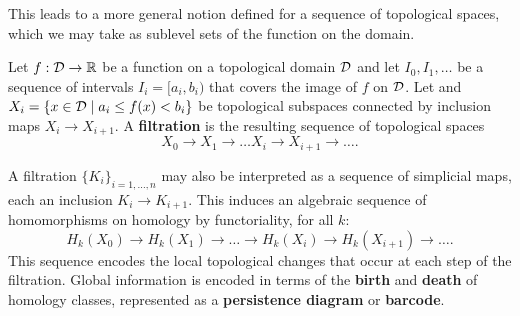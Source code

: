 This leads to a more general notion defined for a sequence of topological spaces, which we may take as sublevel sets of the function on the domain.
\begin{definition}
    Let $f:{\mathcal{D}}\to\mathbb{R}$ be a function on a topological domain ${\mathcal{D}}$ and let $I_0, I_1,\ldots$ be a sequence of intervals $I_i = [a_i, b_i)$ that covers the image of $f$ on ${\mathcal{D}}$.
    Let and $X_i = \{x\in{\mathcal{D}}\mid a_i\leq f(x) < b_i\}$ be topological subspaces connected by inclusion maps $X_i\to X_{i+1}$.
    A \textbf{filtration} is the resulting sequence of topological spaces
    \[X_0\to X_1\to\ldots X_i\to X_{i+1}\to\ldots .\]
\end{definition}
A filtration $\{K_i\}_{i=1,\ldots,n}$ may also be interpreted as a sequence of simplicial maps, each an inclusion $K_i\to K_{i+1}$.
This induces an algebraic sequence of homomorphisms on homology by functoriality, for all $k$:
\[ H_k(X_0)\to H_k(X_1)\to\ldots\to H_k(X_i)\to H_k(X_{i+1})\to\ldots . \]
This sequence encodes the local topological changes that occur at each step of the filtration.
Global information is encoded in terms of the \textbf{birth} and \textbf{death} of homology classes, represented as a \textbf{persistence diagram} or \textbf{barcode}.


